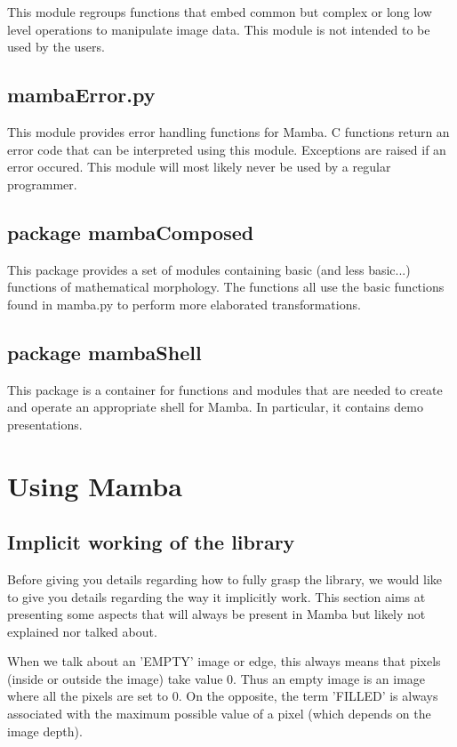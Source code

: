 \documentclass[a4paper,10pt,oneside]{article}
\begin{document}
This module regroups functions that embed common but complex or long low level
operations to manipulate image data. This module is not intended to be used by
the users.

\subsection{mambaError.py}

This module provides error handling functions for Mamba. C functions return an 
error code that can be interpreted using this module. Exceptions are raised if 
an error occured. This module will most likely never be used by a regular 
programmer.

\subsection{package mambaComposed}

This package provides a set of modules containing basic (and less
basic...) functions of mathematical morphology. The functions all use the basic
functions found in mamba.py to perform more elaborated transformations.

\subsection{package mambaShell}

This package is a container for functions and modules that are needed to create
and operate an appropriate shell for Mamba. In particular, it contains demo
presentations.

\pagebreak

\section{Using Mamba}
\label{cha:using_mamba}
\subsection{Implicit working of the library}

Before giving you details regarding how to fully grasp the library, we would
like to give you details regarding the way it implicitly work. This section aims
at presenting some aspects that will always be present in Mamba but likely not 
explained nor talked about.

When we talk about an 'EMPTY' image or edge, this always means that pixels 
(inside or outside the image) take value 0. Thus an empty
image is an image where all the pixels are set to 0. On the opposite, the term 
'FILLED' is always associated with the maximum possible value of a pixel (which depends on 
the image depth).
\end{document}
